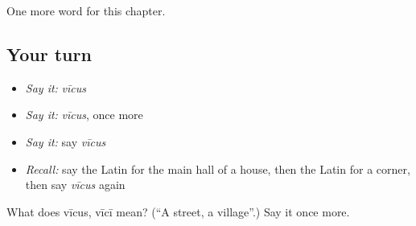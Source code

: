 \begin{grammarlens}[title={What you've built}]
One more word for this chapter.
\end{grammarlens}

\subsection*{Your turn}
\begin{itemize}
\raggedright
  \item \emph{Say it:} \emph{vīcus}
  \item \emph{Say it:} \emph{vīcus}, once more
  \item \emph{Say it:} say \emph{vīcus}
  \item \emph{Recall:} say the Latin for the main hall of a house, then the Latin for a corner, then say \emph{vīcus} again
\end{itemize}

\begin{tcolorbox}[breakable,colback=teal!4,colframe=teal!35!black,title={Before you move on}]
What does vīcus, vīcī mean? (\textquotedblleft{}A street, a village\textquotedblright{}.) Say it once more.
\end{tcolorbox}
